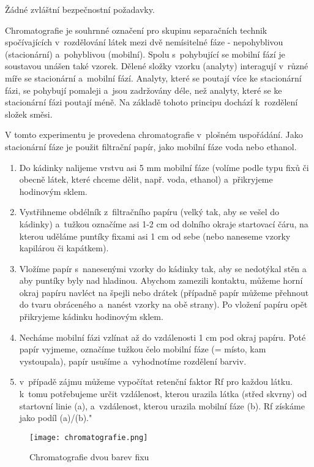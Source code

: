 \hspace{-21pt} 

Žádné zvláštní bezpečnostní požadavky.\\

\hspace{-21pt} 

Chromatografie je souhrnné označení pro skupinu separačních technik spočívajících v~rozdělování látek mezi dvě nemísitelné fáze - nepohyblivou (stacionární) a~pohyblivou (mobilní). Spolu s~pohybující se mobilní fází je soustavou unášen také vzorek. Dělené složky vzorku (analyty) interagují v~různé míře se stacionární a~mobilní fází. Analyty, které se poutají více ke stacionární fázi, se pohybují pomaleji a~jsou zadržovány déle, než analyty, které se ke stacionární fázi poutají méně. Na základě tohoto principu dochází k~rozdělení složek směsi.

V tomto experimentu je provedena chromatografie v~plošném uspořádání. Jako stacionární fáze je použit filtrační papír, jako mobilní fáze voda nebo ethanol. \newline

\hspace{-21pt} 

\begin{enumerate}
\item Do kádinky nalijeme vrstvu asi 5 mm mobilní fáze (volíme podle typu fixů či obecně látek, které chceme dělit, např. voda, ethanol) a~přikryjeme hodinovým sklem.
\item Vystřihneme obdélník z~filtračního papíru (velký tak, aby se vešel do kádinky) a~tužkou označíme asi 1-2 cm od dolního okraje startovací čáru, na kterou uděláme puntíky fixami asi 1 cm od sebe (nebo naneseme vzorky kapilárou či kapátkem).
\item Vložíme papír s~nanesenými vzorky do kádinky tak, aby se nedotýkal stěn a aby puntíky byly nad hladinou.  Abychom zamezili kontaktu, můžeme horní okraj papíru navléct na špejli nebo drátek (případně papír můžeme přehnout do tvaru obráceného  a~nanést vzorky na obě strany). Po vložení papíru opět přikryjeme kádinku hodinovým sklem.
\item Necháme mobilní fázi vzlínat až do vzdálenosti 1 cm pod okraj papíru. Poté papír vyjmeme, označíme tužkou čelo mobilní fáze (= místo, kam vystoupala), papír usušíme a~vyhodnotíme rozdělení barviv.
\item v~případě zájmu můžeme vypočítat retenční faktor Rf pro každou látku. k~tomu potřebujeme určit vzdálenost, kterou urazila látka (střed skvrny) od startovní linie (a), a~vzdálenost, kterou urazila mobilní fáze (b). Rf získáme jako podíl (a)/(b)."
\end{enumerate}

\begin{figure}[h]
    \centering
    \texttt{[image: chromatografie.png]}
    \caption{Chromatografie dvou barev fixu}
\end{figure}

